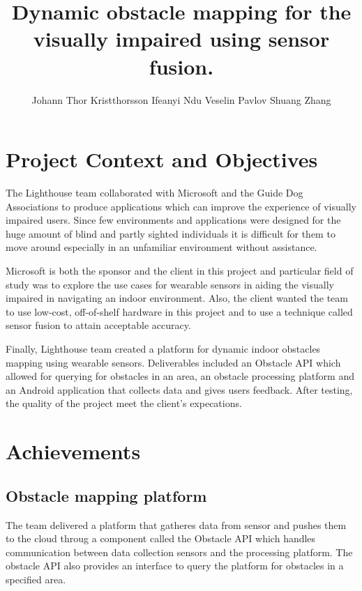 \documentclass[prodmode,acmtosem]{acmsmall} %
\begin{document}

\title{Dynamic obstacle mapping for the visually impaired using sensor fusion.}
\author{Johann Thor Kristthorsson
Ifeanyi Ndu
Veselin Pavlov
Shuang Zhang
}

\maketitle

\section{Project Context and Objectives}
The Lighthouse team collaborated with Microsoft and the Guide Dog Associations to produce applications which can improve the experience of visually impaired users. Since few environments and applications were designed for the huge amount of blind and partly sighted individuals it is difficult for them to move around especially in an unfamiliar environment without assistance. 

Microsoft is both the sponsor and the client in this project and particular field of study was to explore the use cases for wearable sensors in aiding the visually impaired in navigating an indoor environment. Also, the client wanted the team to use low-cost, off-of-shelf hardware in this project and to use a technique called sensor fusion to attain acceptable accuracy.

Finally, Lighthouse team created a platform for dynamic indoor obstacles mapping using wearable sensors. Deliverables included an Obstacle API which allowed for querying for obstacles in an area, an obstacle processing platform and an Android application that collects data and gives users feedback. After testing, the quality of the project meet the client's expecations.

\section{Achievements}
\subsection{Obstacle mapping platform}
The team delivered a platform that gatheres data from sensor and pushes them to the cloud throug a component called the Obstacle API which handles communication between data collection sensors and the processing platform. The obstacle API also provides an interface to query the platform for obstacles in a specified area. 
\end{document}

